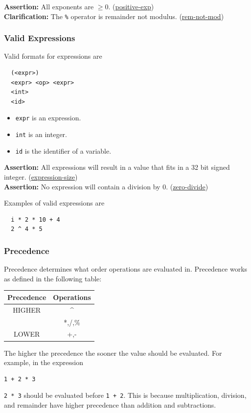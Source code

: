 \documentclass{article}
\newcommand{\code}[1]{\texttt{\textmd{#1}}}
\newcommand{\assertion}[2]{\textbf{Assertion: }#1 (\hyperlink{#2}{#2})}
\newcommand{\clarification}[2]{\textbf{Clarification: }#1 (\hyperlink{#2}{#2})}
\begin{document}
\assertion{All exponents are $\geq 0$.}{positive-exp}\\
\clarification{The \code{\%} operator is remainder not modulus.}{rem-not-mod}

\subsubsection{Valid Expressions}
Valid formats for expressions are
\begin{lstlisting}
  (<expr>)
  <expr> <op> <expr>
  <int>
  <id>
\end{lstlisting}

\begin{itemize}
  \item \code{expr} is an expression.
  \item \code{int} is an integer.
  \item \code{id} is the identifier of a variable.
\end{itemize}

\assertion{All expressions will result in a value that fits in a 32 bit signed integer.}
{expression-size}\\
\assertion{No expression will contain a division by 0.} {zero-divide}

Examples of valid expressions are
\begin{lstlisting}
  i * 2 * 10 + 4
  2 ^ 4 * 5
\end{lstlisting}

\subsubsection{Precedence}
Precedence determines what order operations are evaluated in. Precedence works as defined in the
following table:
\begin{center}
  \begin{tabular}{|c|c|}
    \hline
    \textbf{Precedence} & \textbf{Operations} \\
    \hline
    HIGHER & \textasciicircum \\
           & *,/,\% \\
    LOWER  & +,- \\
    \hline
  \end{tabular}
\end{center}

The higher the precedence the sooner the value should be evaluated. For example, in the expression
\begin{lstlisting}
1 + 2 * 3
\end{lstlisting}
\code{2 * 3} should be evaluated before \code{1 + 2}. This is because multiplication, division,
and remainder have higher precedence than addition and subtractions.
\end{document}
